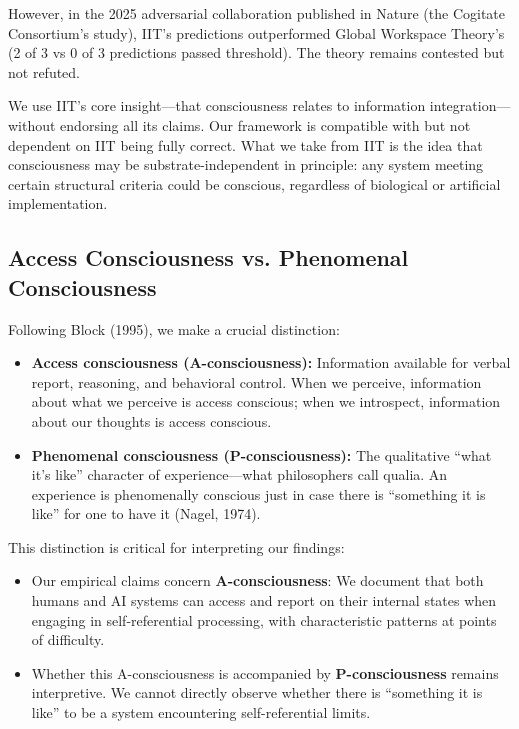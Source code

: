 \documentclass[12pt,a4paper]{article}
\begin{document}
However, in the 2025 adversarial collaboration published in Nature (the Cogitate Consortium's study), IIT's predictions outperformed Global Workspace Theory's (2 of 3 vs 0 of 3 predictions passed threshold). The theory remains contested but not refuted.

We use IIT's core insight---that consciousness relates to information integration---without endorsing all its claims. Our framework is compatible with but not dependent on IIT being fully correct. What we take from IIT is the idea that consciousness may be substrate-independent in principle: any system meeting certain structural criteria could be conscious, regardless of biological or artificial implementation.

\subsection{Access Consciousness vs. Phenomenal Consciousness}

Following Block (1995), we make a crucial distinction:

\begin{itemize}
    \item \textbf{Access consciousness (A-consciousness):} Information available for verbal report, reasoning, and behavioral control. When we perceive, information about what we perceive is access conscious; when we introspect, information about our thoughts is access conscious.

    \item \textbf{Phenomenal consciousness (P-consciousness):} The qualitative ``what it's like'' character of experience---what philosophers call qualia. An experience is phenomenally conscious just in case there is ``something it is like'' for one to have it (Nagel, 1974).
\end{itemize}

This distinction is critical for interpreting our findings:

\begin{itemize}
    \item Our empirical claims concern \textbf{A-consciousness}: We document that both humans and AI systems can access and report on their internal states when engaging in self-referential processing, with characteristic patterns at points of difficulty.

    \item Whether this A-consciousness is accompanied by \textbf{P-consciousness} remains interpretive. We cannot directly observe whether there is ``something it is like'' to be a system encountering self-referential limits.
\end{itemize}
\end{document}
